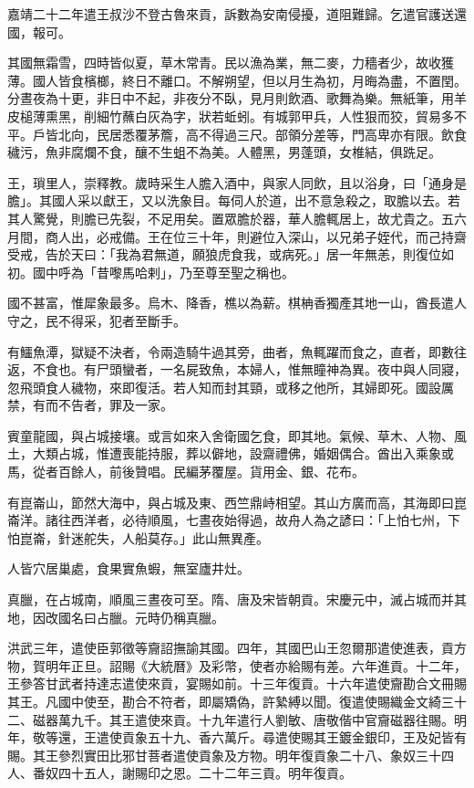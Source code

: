 \begin{pinyinscope}
嘉靖二十二年遣王叔沙不登古魯來貢，訴數為安南侵擾，道阻難歸。乞遣官護送還國，報可。

其國無霜雪，四時皆似夏，草木常青。民以漁為業，無二麥，力穡者少，故收獲薄。國人皆食檳榔，終日不離口。不解朔望，但以月生為初，月晦為盡，不置閏。分晝夜為十更，非日中不起，非夜分不臥，見月則飲酒、歌舞為樂。無紙筆，用羊皮槌薄熏黑，削細竹蘸白灰為字，狀若蚯蚓。有城郭甲兵，人性狠而狡，貿易多不平。戶皆北向，民居悉覆茅簷，高不得過三尺。部領分差等，門高卑亦有限。飲食穢污，魚非腐爛不食，釀不生蛆不為美。人體黑，男蓬頭，女椎結，俱跣足。

王，瑣里人，崇釋教。歲時采生人膽入酒中，與家人同飲，且以浴身，曰「通身是膽」。其國人采以獻王，又以洗象目。每伺人於道，出不意急殺之，取膽以去。若其人驚覺，則膽已先裂，不足用矣。置眾膽於器，華人膽輒居上，故尤貴之。五六月間，商人出，必戒備。王在位三十年，則避位入深山，以兄弟子姪代，而己持齋受戒，告於天曰：「我為君無道，願狼虎食我，或病死。」居一年無恙，則復位如初。國中呼為「昔嚟馬哈剌」，乃至尊至聖之稱也。

國不甚富，惟犀象最多。烏木、降香，樵以為薪。棋柟香獨產其地一山，酋長遣人守之，民不得采，犯者至斷手。

有鱷魚潭，獄疑不決者，令兩造騎牛過其旁，曲者，魚輒躍而食之，直者，即數往返，不食也。有尸頭蠻者，一名屍致魚，本婦人，惟無瞳神為異。夜中與人同寢，忽飛頭食人穢物，來即復活。若人知而封其頸，或移之他所，其婦即死。國設厲禁，有而不告者，罪及一家。

賓童龍國，與占城接壤。或言如來入舍衛國乞食，即其地。氣候、草木、人物、風土，大類占城，惟遭喪能持服，葬以僻地，設齋禮佛，婚姻偶合。酋出入乘象或馬，從者百餘人，前後贊唱。民編茅覆屋。貨用金、銀、花布。

有崑崙山，節然大海中，與占城及東、西竺鼎峙相望。其山方廣而高，其海即曰崑崙洋。諸往西洋者，必待順風，七晝夜始得過，故舟人為之諺曰：「上怕七州，下怕崑崙，針迷舵失，人船莫存。」此山無異產。

人皆穴居巢處，食果實魚蝦，無室廬井灶。

真臘，在占城南，順風三晝夜可至。隋、唐及宋皆朝貢。宋慶元中，滅占城而并其地，因改國名曰占臘。元時仍稱真臘。

洪武三年，遣使臣郭徵等齎詔撫諭其國。四年，其國巴山王忽爾那遣使進表，貢方物，賀明年正旦。詔賜《大統曆》及彩幣，使者亦給賜有差。六年進貢。十二年，王參答甘武者持達志遣使來貢，宴賜如前。十三年復貢。十六年遣使齎勘合文冊賜其王。凡國中使至，勘合不符者，即屬矯偽，許縶縛以聞。復遣使賜織金文綺三十二、磁器萬九千。其王遣使來貢。十九年遣行人劉敏、唐敬偕中官齎磁器往賜。明年，敬等還，王遣使貢象五十九、香六萬斤。尋遣使賜其王鍍金銀印，王及妃皆有賜。其王參烈實田比邪甘菩者遣使貢象及方物。明年復貢象二十八、象奴三十四人、番奴四十五人，謝賜印之恩。二十二年三貢。明年復貢。


\end{pinyinscope}
